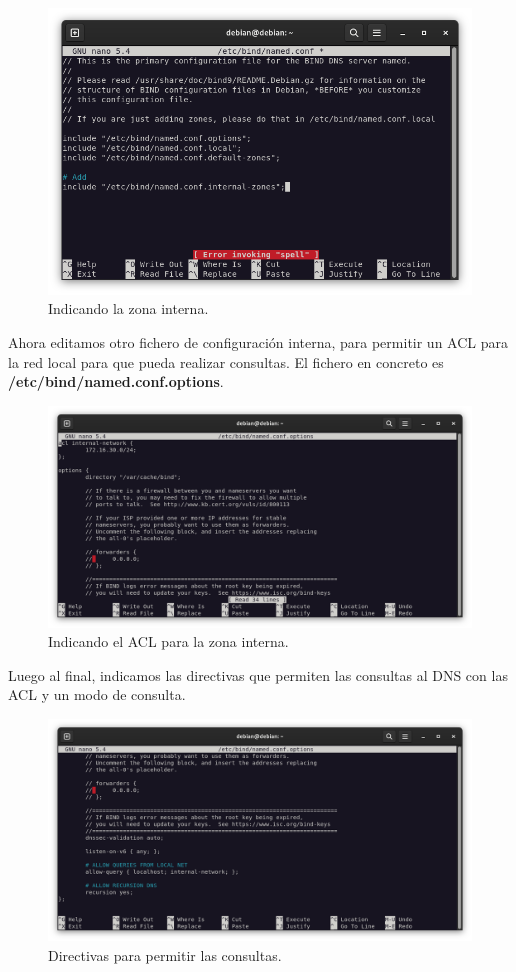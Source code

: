\begin{figure}[H]
	\centering
	\includegraphics[scale=0.30]{01}
	\caption{Indicando la zona interna.}
\end{figure}

Ahora editamos otro fichero de configuración interna, para permitir un ACL para la red local para que pueda realizar consultas. El fichero en concreto es \textbf{/etc/bind/named.conf.options}.

\begin{figure}[H]
	\centering
	\includegraphics[scale=0.30]{02}
	\caption{Indicando el ACL para la zona interna.}
\end{figure}

Luego al final, indicamos las directivas que permiten las consultas al DNS con las ACL y un modo de consulta.

\begin{figure}[H]
	\centering
	\includegraphics[scale=0.30]{03}
	\caption{Directivas para permitir las consultas.}
\end{figure}

